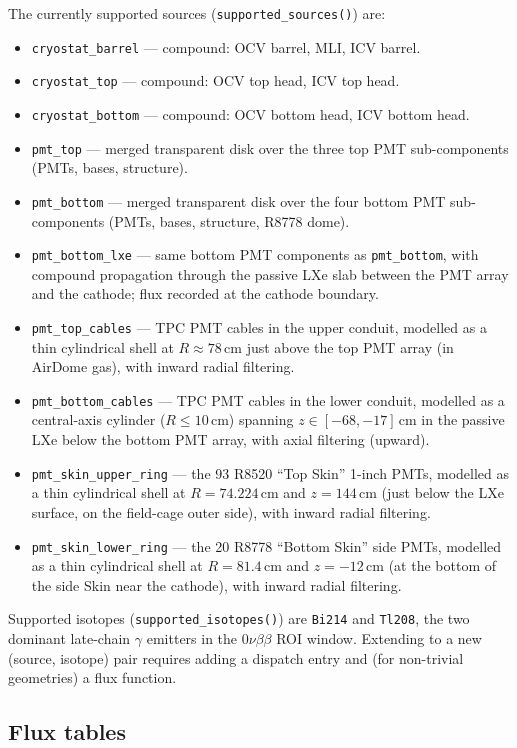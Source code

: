 \documentclass[11pt]{article}
\begin{document}
The currently supported sources (\texttt{supported\_sources()}) are:
\begin{itemize}
\item \texttt{cryostat\_barrel} --- compound: OCV barrel, MLI, ICV barrel.
\item \texttt{cryostat\_top} --- compound: OCV top head, ICV top head.
\item \texttt{cryostat\_bottom} --- compound: OCV bottom head, ICV bottom
head.
\item \texttt{pmt\_top} --- merged transparent disk over the three top PMT
sub-components (PMTs, bases, structure).
\item \texttt{pmt\_bottom} --- merged transparent disk over the four bottom
PMT sub-components (PMTs, bases, structure, R8778 dome).
\item \texttt{pmt\_bottom\_lxe} --- same bottom PMT components as
\texttt{pmt\_bottom}, with compound propagation through the passive LXe
slab between the PMT array and the cathode; flux recorded at the cathode
boundary.
\item \texttt{pmt\_top\_cables} --- TPC PMT cables in the upper conduit,
modelled as a thin cylindrical shell at $R \approx 78$\,cm just above the
top PMT array (in AirDome gas), with inward radial filtering.
\item \texttt{pmt\_bottom\_cables} --- TPC PMT cables in the lower
conduit, modelled as a central-axis cylinder ($R \le 10$\,cm) spanning
$z \in [-68, -17]$\,cm in the passive LXe below the bottom PMT array,
with axial filtering (upward).
\item \texttt{pmt\_skin\_upper\_ring} --- the 93 R8520 ``Top Skin'' 1-inch
PMTs, modelled as a thin cylindrical shell at $R = 74.224$\,cm and
$z = 144$\,cm (just below the LXe surface, on the field-cage outer
side), with inward radial filtering.
\item \texttt{pmt\_skin\_lower\_ring} --- the 20 R8778 ``Bottom Skin''
side PMTs, modelled as a thin cylindrical shell at $R = 81.4$\,cm and
$z = -12$\,cm (at the bottom of the side Skin near the cathode),
with inward radial filtering.
\end{itemize}

Supported isotopes (\texttt{supported\_isotopes()}) are \texttt{Bi214} and
\texttt{Tl208}, the two dominant late-chain $\gamma$ emitters in the
$0\nu\beta\beta$ ROI window. Extending to a new (source, isotope) pair
requires adding a dispatch entry and (for non-trivial geometries) a flux
function.

\subsection{Flux tables}
\label{sec:source-fluxtables}
\end{document}
